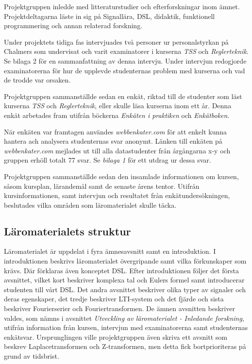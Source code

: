\documentclass[]{article}
\begin{document}
Projektgruppen inledde med litteraturstudier och efterforskningar inom ämnet. Projektdeltagarna läste in sig på 
Signallära, DSL, didaktik, funktionell programmering och annan relaterad forskning.

Under projektets tidiga fas intervjuades två personer ur personalstyrkan på Chalmers som undervisat och varit 
examinatorer i kurserna \textit{TSS} och \textit{Reglerteknik}. Se {bilaga 2} för en sammanfattning av denna intervju. 
Under intervjun redogjorde examinatorerna för hur de upplevde studenternas problem med kurserna och vad de trodde var 
orsaken.

Projektgruppen sammanställde sedan en enkät, riktad till de studenter som läst kurserna \textit{TSS} och 
\textit{Reglerteknik}, eller skulle läsa kurserna inom ett år. Denna enkät arbetades fram utifrån böckerna 
\textit{Enkäten i praktiken} och \textit{Enkätboken}.

När enkäten var framtagen användes \textit{webbenkater.com} för att enkelt kunna hantera ach analysera studenternas svar 
anonymt. Länken till enkäten på \textit{webbenkater.com} mejlades ut till alla datastudenter från årgångarna x-y och 
gruppen erhöll totalt 77 svar.  Se \textit{bilaga 1} för ett utdrag ur dessa svar.

Projektgruppen sammanställde sedan den insamlade informationen om kursen, såsom kursplan, lärandemål samt de senaste 
årens tentor. Utifrån kursinformationen, samt intervjun och resultatet från enkätundersökningen, beslutades vilka 
områden som läromaterialet skulle täcka.


\subsection{Läromaterialets struktur}

Läromaterialet är uppdelat i fyra ämnesavsnitt samt en introduktion. I introduktionen beskrivs läromaterialet 
övergripande samt vilka förkunskaper som krävs. Där förklaras även konceptet DSL. Efter introduktionen följer det 
första avsnittet, vilket kort beskriver komplexa tal och Eulers formel samt introducerar studenten till vårt DSL. Det 
andra avsnittet beskriver olika typer av signaler och deras egenskaper, det tredje beskriver LTI-system och det fjärde 
och sista beskriver Fourierserier och Fouriertransformen. De ämnen avsnitten beskriver valdes, som nämns i avsnittet 
\textit{Utveckling av läromaterialet - Inledande forskning}, utifrån information från kursen, intervjun med 
examinatorerna samt studenternas enkätsvar. Ursprunglingen ville projektgruppen även skriva ett avsnitt som beskrev 
Laplacetransformen och Z-transformen, men detta fick bortprioriteras på grund av tidsbrist. 
\end{document}
